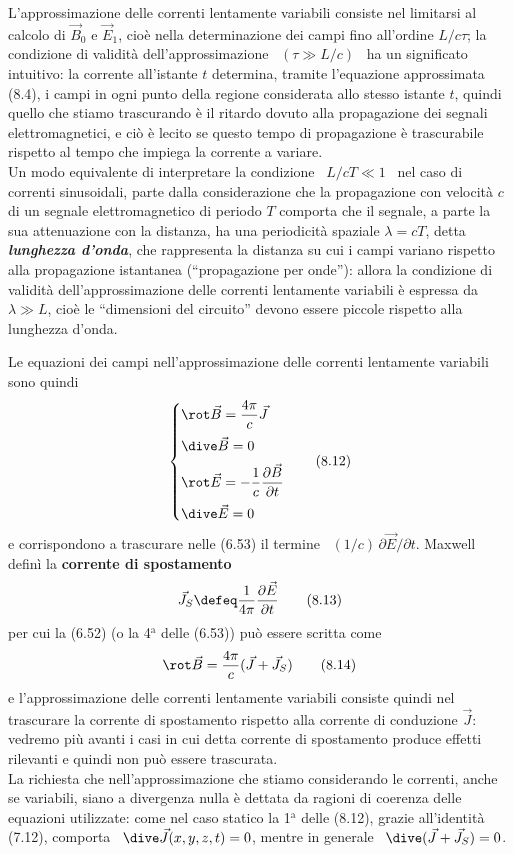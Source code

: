 L'approssimazione delle correnti lentamente variabili consiste nel limitarsi al
calcolo di $\vec B_0$ e $\vec E_1$, cio\`e nella determinazione dei campi fino
all'ordine $L/c\tau$; la condizione di validit\`a dell'approssimazione
\ $(\tau\gg L/c)$ \ ha un significato intuitivo: la corrente all'istante $t$
determina, tramite l'equazione approssimata (8.4), i campi in ogni punto della
regione considerata allo stesso istante $t$, quindi quello che stiamo
trascurando \`e il ritardo dovuto alla propagazione dei segnali
elettromagnetici, e ci\`o \`e lecito se questo tempo di propagazione \`e
trascurabile rispetto al tempo che impiega la corrente a variare.\\
Un modo equivalente di interpretare la condizione \ $L/cT\ll1$ \ nel caso di
correnti sinusoidali, parte dalla considerazione che la propagazione con
velocit\`a $c$ di un segnale elettromagnetico di periodo $T$ comporta che il
segnale, a parte la sua attenuazione con la distanza, ha una periodicit\`a
spaziale $\lambda=cT$, detta \textbf{\textit{lunghezza d'onda}}, che rappresenta
la distanza su cui i campi variano rispetto alla propagazione istantanea
(``propagazione per onde''): allora la condizione di validit\`a
dell'approssimazione delle correnti lentamente variabili \`e espressa da
\ $\lambda\gg L$, cio\`e le ``dimensioni del circuito'' devono essere piccole
rispetto alla lunghezza d'onda.

Le equazioni dei campi nell'approssimazione delle correnti lentamente variabili
sono quindi
\begin{equation}
  \left\{\begin{aligned}
    &\rot\vec B=\frac{4\pi}{c}\vec J\\[2pt]
    &\dive\vec B=0\\[2pt]
    &\rot\vec E=-\frac{1}{c}\frac{\partial\vec B}{\partial t}\\[2pt]
    &\dive\vec E=0
  \end{aligned}\right.
  \tag{8.12}
\end{equation}
e corrispondono a trascurare nelle (6.53) il termine
\ $(1/c)\,\partial\vec E/\partial t$. Maxwell defin\`i la \textbf{corrente di
spostamento}
\begin{equation}
  \vec J_S\defeq\frac{1}{4\pi}\frac{\partial\vec E}{\partial t}
  \tag{8.13}
\end{equation}
per cui la (6.52) \big(o la 4$^\mathrm{a}$ delle (6.53)\big) pu\`o essere
scritta come
\begin{equation}
  \rot\vec B=\frac{4\pi}{c}(\vec J+\vec J_S)
  \tag{8.14}
\end{equation}
e l'approssimazione delle correnti lentamente variabili consiste quindi nel
trascurare la corrente di spostamento rispetto alla corrente di conduzione
$\vec J$: vedremo pi\`u avanti i casi in cui detta corrente di spostamento
produce effetti rilevanti e quindi non pu\`o essere trascurata.\\
La richiesta che nell'approssimazione che stiamo considerando le correnti, anche
se variabili, siano a divergenza nulla \`e dettata da ragioni di coerenza delle
equazioni utilizzate: come nel caso statico la 1$^\mathrm{a}$ delle (8.12),
grazie all'identit\`a (7.12), comporta \ $\dive\vec J(x,y,z,t)=0$, mentre in
generale \ $\dive(\vec J+\vec J_S)=0$.


